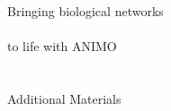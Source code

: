\documentclass{bmcart}
\begin{document}
\pagestyle{plain}

\clearpage

\thispagestyle{empty}
\ \\ \ \\ \ \\ \ \\ \ \\
\begin{center}
 {\Huge Bringing biological networks}\\ \ \\ {\Huge to life with ANIMO}\\ \ \\ \ \\
 {\huge Additional Materials}
\end{center}
\clearpage






\makeatletter
\end{document}
